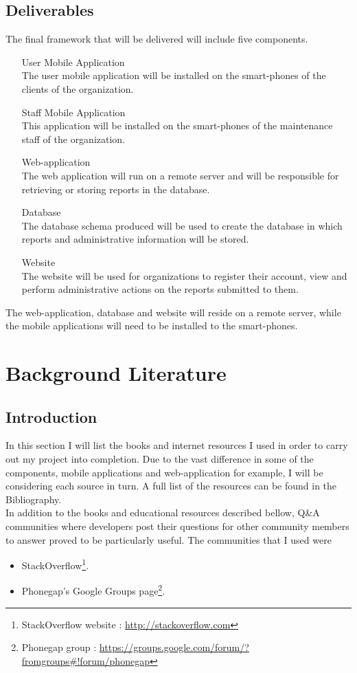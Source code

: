 \documentclass[12pt]{ecsproject}     %
\begin{document}
\section{Deliverables}
\label{sect:deliv}
The final framework that will be delivered will include five components.
\begin{itemize}
\item[User Mobile Application]\hfill \\
The user mobile application will be installed on the smart-phones of the clients of the organization.
\item[Staff Mobile Application]\hfill \\
This application will be installed on the smart-phones of the maintenance staff of the organization.
\item[Web-application]\hfill \\
The web application will run on a remote server and will be responsible for retrieving or storing reports in the database.
\item[Database]\hfill \\
The database schema produced will be used to create the database in which reports and administrative information will be stored.
\item[Website]\hfill \\
The website will be used for organizations to register their account, view and perform administrative actions on the reports submitted to them.
\end{itemize}

The web-application, database and website will reside on a remote server, while the mobile applications will need to be installed to the smart-phones.

\chapter{Background Literature}
\label{chap:bl}
\section{Introduction}
In this section I will list the books and internet resources I used in order to carry out my project into completion. Due to the vast difference in some of the components, mobile applications and web-application for example, I will be considering each source in turn. A full list of the resources can be found in the Bibliography.\\

In addition to the books and educational resources described bellow, Q\&A communities where developers post their questions for  other community members to answer proved to be particularly useful. The communities that I used were 
\begin{itemize}
\item StackOverflow\footnote{StackOverflow website : \href{http://stackoverflow.com}{http://stackoverflow.com}}.
\item Phonegap's Google Groups page\footnote{Phonegap group : \href{https://groups.google.com/forum/?fromgroups\#!forum/phonegap}{https://groups.google.com/forum/?fromgroups\#!forum/phonegap}}.
\end{itemize}
\end{document}
